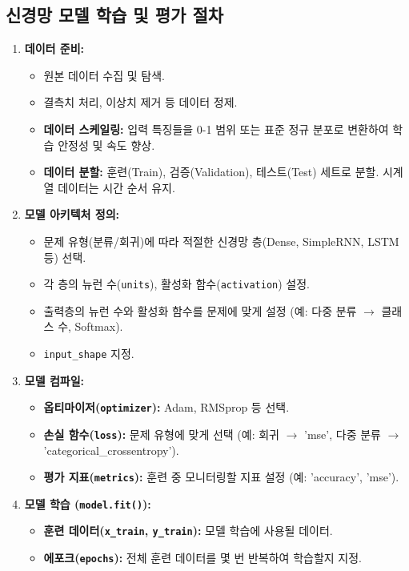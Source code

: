 \documentclass[11pt,a4paper]{book}
\theoremstyle{definition}
\begin{document}
\subsection{신경망 모델 학습 및 평가 절차}
\begin{enumerate}
    \item \textbf{데이터 준비:}
    \begin{itemize}
        \item 원본 데이터 수집 및 탐색.
        \item 결측치 처리, 이상치 제거 등 데이터 정제.
        \item \textbf{데이터 스케일링:} 입력 특징들을 0-1 범위 또는 표준 정규 분포로 변환하여 학습 안정성 및 속도 향상.
        \item \textbf{데이터 분할:} 훈련(Train), 검증(Validation), 테스트(Test) 세트로 분할. 시계열 데이터는 시간 순서 유지.
    \end{itemize}
    \item \textbf{모델 아키텍처 정의:}
    \begin{itemize}
        \item 문제 유형(분류/회귀)에 따라 적절한 신경망 층(Dense, SimpleRNN, LSTM 등) 선택.
        \item 각 층의 뉴런 수(\texttt{units}), 활성화 함수(\texttt{activation}) 설정.
        \item 출력층의 뉴런 수와 활성화 함수를 문제에 맞게 설정 (예: 다중 분류 $\rightarrow$ 클래스 수, Softmax).
        \item \texttt{input\_shape} 지정.
    \end{itemize}
    \item \textbf{모델 컴파일:}
    \begin{itemize}
        \item \textbf{옵티마이저(\texttt{optimizer}):} Adam, RMSprop 등 선택.
        \item \textbf{손실 함수(\texttt{loss}):} 문제 유형에 맞게 선택 (예: 회귀 $\rightarrow$ 'mse', 다중 분류 $\rightarrow$ 'categorical_crossentropy').
        \item \textbf{평가 지표(\texttt{metrics}):} 훈련 중 모니터링할 지표 설정 (예: 'accuracy', 'mse').
    \end{itemize}
    \item \textbf{모델 학습 (\texttt{model.fit()}):}
    \begin{itemize}
        \item \textbf{훈련 데이터(\texttt{x\_train}, \texttt{y\_train}):} 모델 학습에 사용될 데이터.
        \item \textbf{에포크(\texttt{epochs}):} 전체 훈련 데이터를 몇 번 반복하여 학습할지 지정.

\end{itemize}
\end{enumerate}
\end{document}
